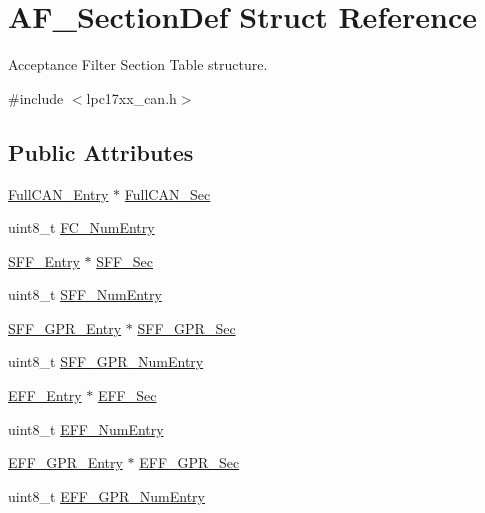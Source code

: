 \hypertarget{struct_a_f___section_def}{\section{\-A\-F\-\_\-\-Section\-Def \-Struct \-Reference}
\label{struct_a_f___section_def}
}


\-Acceptance \-Filter \-Section \-Table structure.  




{\ttfamily \#include $<$lpc17xx\-\_\-can.\-h$>$}

\subsection*{\-Public \-Attributes}
\begin{DoxyCompactItemize}
\item 
\hyperlink{struct_full_c_a_n___entry}{\-Full\-C\-A\-N\-\_\-\-Entry} $\ast$ \hyperlink{struct_a_f___section_def_a3d93835ce208050b74148dbcbdec7858}{\-Full\-C\-A\-N\-\_\-\-Sec}
\item 
uint8\-\_\-t \hyperlink{struct_a_f___section_def_a61c32cba35b74d65bf6585c95221322b}{\-F\-C\-\_\-\-Num\-Entry}
\item 
\hyperlink{struct_s_f_f___entry}{\-S\-F\-F\-\_\-\-Entry} $\ast$ \hyperlink{struct_a_f___section_def_a186af2dbb59fd767dbd1d0ee8d96dde6}{\-S\-F\-F\-\_\-\-Sec}
\item 
uint8\-\_\-t \hyperlink{struct_a_f___section_def_a0fe6f998e94c282b49d81604bc28c110}{\-S\-F\-F\-\_\-\-Num\-Entry}
\item 
\hyperlink{struct_s_f_f___g_p_r___entry}{\-S\-F\-F\-\_\-\-G\-P\-R\-\_\-\-Entry} $\ast$ \hyperlink{struct_a_f___section_def_a1f961d228820b292a137a3988e8d1419}{\-S\-F\-F\-\_\-\-G\-P\-R\-\_\-\-Sec}
\item 
uint8\-\_\-t \hyperlink{struct_a_f___section_def_a5256e7d8484c27ce828332c303519f4e}{\-S\-F\-F\-\_\-\-G\-P\-R\-\_\-\-Num\-Entry}
\item 
\hyperlink{struct_e_f_f___entry}{\-E\-F\-F\-\_\-\-Entry} $\ast$ \hyperlink{struct_a_f___section_def_a4b569040ad424cfa22f56cbdb92c9f75}{\-E\-F\-F\-\_\-\-Sec}
\item 
uint8\-\_\-t \hyperlink{struct_a_f___section_def_aecd324d629216a0982cee2fa2234f58f}{\-E\-F\-F\-\_\-\-Num\-Entry}
\item 
\hyperlink{struct_e_f_f___g_p_r___entry}{\-E\-F\-F\-\_\-\-G\-P\-R\-\_\-\-Entry} $\ast$ \hyperlink{struct_a_f___section_def_adc6b791fa347e7c1eb36e91df51e5181}{\-E\-F\-F\-\_\-\-G\-P\-R\-\_\-\-Sec}
\item 
uint8\-\_\-t \hyperlink{struct_a_f___section_def_a1bf2008b2a34adc112f446f2dd450c76}{\-E\-F\-F\-\_\-\-G\-P\-R\-\_\-\-Num\-Entry}
\end{DoxyCompactItemize}


